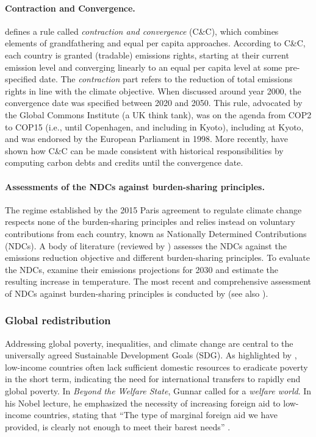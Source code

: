 \documentclass[12pt,english]{article}
\begin{document}
\paragraph{Contraction and Convergence.} \citet{meyer_briefing_2004} defines a rule called \textit{contraction and convergence} (C\&C), which combines elements of grandfathering and equal per capita approaches. According to C\&C, each country is granted (tradable) emissions rights, starting at their current emission level and converging linearly to an equal per capita level at some pre-specified date. The \textit{contraction} part refers to the reduction of total emissions rights in line with the climate objective. When discussed around year 2000, the convergence date was specified between 2020 and 2050. This rule, advocated by the Global Commons Institute (a UK think tank), was on the agenda from COP2 to COP15 (i.e., until Copenhagen, and including in Kyoto), including at Kyoto, and was endorsed by the European Parliament in 1998. More recently, \citet{gignac_allocating_2015} have shown how C\&C can be made consistent with historical responsibilities by computing carbon debts and credits until the convergence date.

\paragraph{Assessments of the NDCs against burden-sharing principles.} 
The regime established by the 2015 Paris agreement to regulate climate change respects none of the burden-sharing principles and relies instead on voluntary contributions from each country, known as Nationally Determined Contributions (NDCs). A body of literature (reviewed by \citealp{hohne_regional_2014}) assesses the NDCs against the emissions reduction objective and different burden-sharing principles. To evaluate the NDCs, \citet{gao_sufficient_2019} examine their emissions projections for 2030 and estimate the resulting increase in temperature. The most recent and comprehensive assessment of NDCs against burden-sharing principles is conducted by \citet{van_den_berg_implications_2020} (see also \citealp{robiou_du_pont_national_2016,robiou_du_pont_equitable_2017,raupach_sharing_2014}). 



\subsubsection{Global redistribution}\label{subsubsec:literature_redistribution}
Addressing global poverty, inequalities, and climate change are central to the universally agreed Sustainable Development Goals (SDG). %
As highlighted by \citet{bolch_arithmetics_2022}, low-income countries often lack sufficient domestic resources to eradicate poverty in the short term, indicating the need for international transfers to rapidly end global poverty. %
In \textit{Beyond the Welfare State}, Gunnar \citet{myrdal_beyond_1960} called for a \textit{welfare world}. In his Nobel lecture, he emphasized the necessity of increasing foreign aid to low-income countries, stating that ``The type of marginal foreign aid we have provided, is clearly not enough to meet their barest needs'' \citep{myrdal_equality_1975}.
\end{document}
